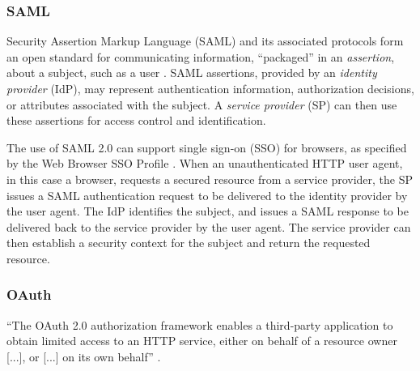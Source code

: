 \subsubsection{SAML}
Security Assertion Markup Language (SAML) and its associated protocols form an open standard for communicating information, ``packaged'' in an \emph{assertion}, about a subject, such as a user \autocite{Kemp2005}. SAML assertions, provided by an \emph{identity provider} (IdP), may represent authentication information, authorization decisions, or attributes associated with the subject. A \emph{service provider} (SP) can then use these assertions for access control and identification.

The use of SAML 2.0 can support single sign-on (SSO) for browsers, as specified by the Web Browser SSO Profile \autocite{Hughes2005}. When an unauthenticated HTTP user agent, in this case a browser, requests a secured resource from a service provider, the SP issues a SAML authentication request to be delivered to the identity provider by the user agent. The IdP identifies the subject, and issues a SAML response to be delivered back to the service provider by the user agent. The service provider can then establish a security context for the subject and return the requested resource. 

\subsubsection{OAuth}
``The OAuth 2.0 authorization framework enables a third-party
application to obtain limited access to an HTTP service, either on
behalf of a resource owner [...], or [...] on its own behalf'' \autocite{Hardt2023}.

